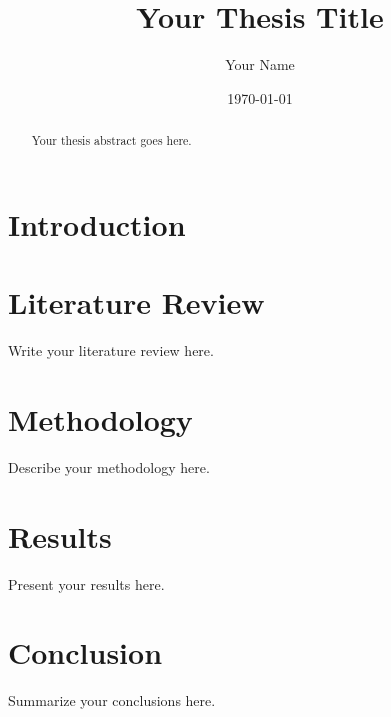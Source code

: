 \documentclass[12pt,a4paper]{report}
\title{Your Thesis Title}
\author{Your Name}
\date{\today}
\begin{document}
\maketitle

\begin{abstract}
Your thesis abstract goes here.
\end{abstract}

\tableofcontents

\chapter{Introduction}


\chapter{Literature Review}
Write your literature review here.

\chapter{Methodology}
Describe your methodology here.

\chapter{Results}
Present your results here.

\chapter{Conclusion}
Summarize your conclusions here.



\end{document}
